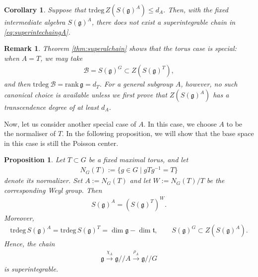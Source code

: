\documentclass[11pt,reqno]{amsart}
\newtheorem*{theorem A}{Main Theorem A}
\newtheorem*{theorem B}{Main Theorem B}
\newtheorem*{theorem C}{Main Theorem C}
\newtheorem*{theorem D}{Main Theorem D}
\newtheorem{proposition}[theorem]{Proposition}
\theoremstyle{definition}
\theoremstyle{plain}
\newtheorem{corollary}[theorem]{Corollary}
\newtheorem{remark}[theorem]{Remark}
\theoremstyle{conclusion}
\begin{document}
\begin{corollary}
    \label{coro:nobasechain}
    Suppose that $\mathrm{trdeg}\, Z(S(\mathfrak{g})^A) \leq d_A$. Then, with the fixed intermediate algebra $S(\mathfrak{g})^A$, there does not exist a superintegrable chain in \eqref{eq:superintechaingA}. 
\end{corollary}
\begin{remark}
    Theorem \ref{thm:superalchain} shows that the torus case is special: when $A = T$, we may take \begin{align*}
\mathcal{B}  =  S(\mathfrak{g})^G\subset Z \left(S(\mathfrak{g})^T\right),
\end{align*} and then $\mathrm{trdeg} \ \mathcal{B}  = \mathrm{rank} \, \mathfrak{g}  =  d_T$. For a general subgroup $A$, however, no such canonical choice is available unless we first prove that $Z(S(\mathfrak{g})^A)$ has a transcendence degree of at least $d_A$.
\end{remark}

Now, let us consider another special case of $A$. In this case, we choose $A$ to be the normaliser of $T$. In the following proposition, we will show that the base space in this case is still the Poisson center. 


\begin{proposition}\label{prop:normalizerchain}
Let $T\subset G$ be a fixed maximal torus, and let \begin{align*}
    N_G(T):=\{g\in G\mid gTg^{-1}=T\}
\end{align*} denote its normalizer. Set $A:=N_G(T)$ and let $W:=N_G(T)/T$ be the corresponding Weyl group. Then \begin{align*}
S(\mathfrak{g})^A = \left(S(\mathfrak{g})^T\right)^W.
\end{align*} Moreover, \begin{align*}
\mathrm{trdeg}\,S(\mathfrak{g})^A = \mathrm{trdeg}\,S(\mathfrak{g})^T = \dim\mathfrak{g}-\dim\mathfrak{t}, \qquad S(\mathfrak{g})^G\subset Z \left(S(\mathfrak{g})^A\right).
\end{align*} Hence, the chain \begin{align*}
\mathfrak{g} \xrightarrow{\chi_A} \mathfrak{g}//A \xrightarrow{\rho_A} \mathfrak{g}//G
\end{align*} is superintegrable.
\end{proposition}
\end{document}
